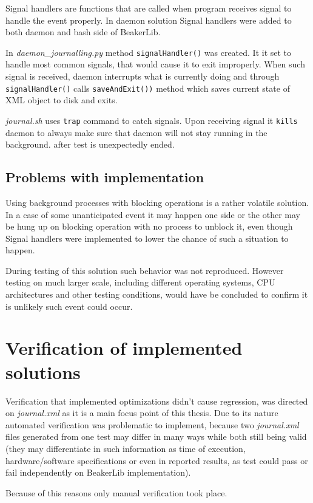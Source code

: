 Signal handlers are functions that are called when program receives signal to handle the event properly. In daemon solution Signal handlers were added to both daemon and bash side of BeakerLib.

In \textit{daemon\_journalling.py} method \texttt{signalHandler()} was created. It it set to handle most common signals, that would cause it to exit improperly. When such signal is received, daemon interrupts what is currently doing and through \texttt{signalHandler()} calls \texttt{saveAndExit())} method which saves current state of XML object to disk and exits.

\textit{journal.sh} uses \texttt{trap} command to catch signals. Upon receiving signal it \texttt{kills} daemon to always make sure that daemon will not stay running in the background. after test is unexpectedly ended.  

\subsection{Problems with implementation}
Using background processes with blocking operations is a rather volatile solution. In a case of some unanticipated event it may happen one side or the other may be hung up on blocking operation with no process to unblock it, even though Signal handlers were implemented to lower the chance of such a situation to happen.

During testing of this solution such behavior was not reproduced. However testing on much larger scale, including different operating systems, CPU architectures and other testing conditions, would have be concluded to confirm it is unlikely such event could occur. 

\section{Verification of implemented solutions}
Verification that implemented optimizations didn't cause regression, was directed on \textit{journal.xml} as it is a main focus point of this thesis. Due to its nature automated verification was problematic to implement, because two \textit{journal.xml} files generated from one test may differ in many ways while both still being valid (they may differentiate in such information as time of execution, hardware/software specifications or even in reported results, as test could pass or fail independently on BeakerLib implementation).

Because of this reasons only manual verification took place.

